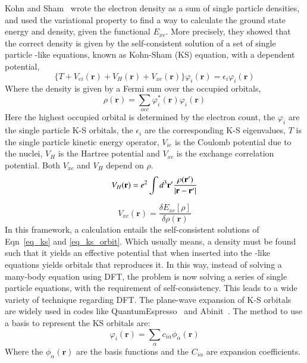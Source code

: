 Kohn and Sham~\cite{kohn1965self} wrote the electron density as a sum of single particle densities, and used the variational property to find a way to calculate the ground state energy and density, given the functional $E_{xc}$. More precisely, they showed that the correct density is given by the self-consistent solution of a set of single particle \schrod-like equations, known as Kohn-Sham (KS) equation, with a dependent potential,
\begin{equation}
\label{eq_ks}
\{T + V_{ei}(\mathbf{r}) + V_H (\mathbf{r}) + V_{xc}(\mathbf{r})\}\varphi_i(\mathbf{r}) = \epsilon_i \varphi_i(\mathbf{r})
\end{equation}
Where the density is given by a Fermi sum over the occupied orbitals,
\begin{equation}
\label{eq_ks_orbit}
\rho(\mathbf{r}) = \sum_{occ} \varphi^{\ast}_i (\mathbf{r})\varphi_i(\mathbf{r})
\end{equation}
Here the highest occupied orbital is determined by the electron count, the $\varphi_i$ are the single particle K-S orbitals, the $\epsilon_i$ are the corresponding K-S eigenvalues, $T$ is the single particle kinetic energy operator, $V_{ie}$ is the Coulomb potential due to the nuclei, $V_H$ is the Hartree potential and $V_{xc}$ is the exchange correlation potential. Both $V_{xc}$ and $V_H$ depend on $\rho$.
\begin{equation}
\label{eq_hartree_density}
V_H(\mathbf{r}) = e^2 \int d^3 \mathbf{r}' \frac{\rho(\mathbf{r'})}{\abs{\mathbf{r}-\mathbf{r'}}}
\end{equation}

\begin{equation}
\label{eq_xc_ks}
V_{xc}(\mathbf{r}) = \frac{\delta E_{xc}[\rho]}{\delta\rho(\mathbf{r})}
\end{equation}
In this framework, a calculation entails the self-consistent solutions of Eqn~\ref{eq_ks} and \ref{eq_ks_orbit}. Which usually means, a density must be found such that it yields an effective potential that when inserted into the \schrod-like equations yields orbitals that reproduces it. In this way, instead of solving a many-body \schrod equation using DFT,  the problem is now solving a series of single particle equations, with the requirement of self-consistency. This leads to a wide variety of technique regarding DFT. The plane-wave expansion of K-S orbitals are widely used in codes like QuantumEspresso~\cite{giannozzi2009quantum} and Abinit~\cite{gonze2002first}. The method to use a basis to represent the KS orbitals are:
\begin{equation}
\label{eq_basis}
\varphi_i (\mathbf{r}) = \sum_{\alpha} c_{i\alpha} \phi_{\alpha} (\mathbf{r})
\end{equation}
Where the $\phi_{\alpha}(\mathbf{r})$ are the basis functions and the $C_{i\alpha}$ are expansion coefficients.

